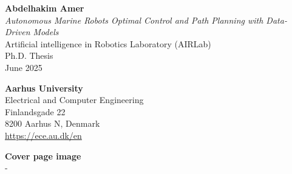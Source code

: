 \documentclass[
10pt, %
b5paper, %
twoside, %
openright  %
]{book}  %
\begin{document}
% 


\BgThispage  %
\vspace*{\fill}
\begin{minipage}{0.6\textwidth}
{}

\vspace*{\fill}
\textbf{Abdelhakim Amer } \\
\textit{Autonomous Marine Robots Optimal
Control and Path Planning with
Data-Driven Models } \\
Artificial intelligence in Robotics Laboratory (AIRLab) \\
Ph.D. Thesis \\
June 2025

\vspace*{2ex}
\textbf{Aarhus University} \\
Electrical and Computer Engineering \\
Finlandsgade 22 \\
8200 Aarhus N, Denmark \\
\url{https://ece.au.dk/en}

\vspace*{2ex}
\textbf{Cover page image} \\
- \\
\vspace*{2ex}
\end{minipage}
\hfill
\end{document}
